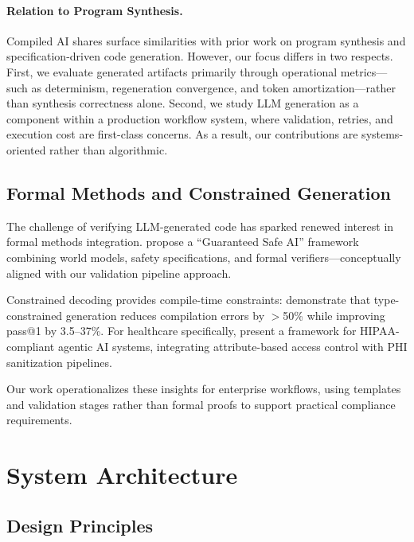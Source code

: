 \documentclass[11pt]{article}
\begin{document}
\paragraph{Relation to Program Synthesis.}
Compiled AI shares surface similarities with prior work on program synthesis and specification-driven code generation. However, our focus differs in two respects. First, we evaluate generated artifacts primarily through operational metrics—such as determinism, regeneration convergence, and token amortization—rather than synthesis correctness alone. Second, we study LLM generation as a component within a production workflow system, where validation, retries, and execution cost are first-class concerns. As a result, our contributions are systems-oriented rather than algorithmic.

\subsection{Formal Methods and Constrained Generation}

The challenge of verifying LLM-generated code has sparked renewed interest in formal methods integration. \citet{dalrymple2024guaranteed} propose a ``Guaranteed Safe AI'' framework combining world models, safety specifications, and formal verifiers—conceptually aligned with our validation pipeline approach.

Constrained decoding provides compile-time constraints: \citet{mundler2025typeconstrained} demonstrate that type-constrained generation reduces compilation errors by $>$50\% while improving pass@1 by 3.5--37\%. For healthcare specifically, \citet{neupane2025hipaa} present a framework for HIPAA-compliant agentic AI systems, integrating attribute-based access control with PHI sanitization pipelines.

Our work operationalizes these insights for enterprise workflows, using templates and validation stages rather than formal proofs to support practical compliance requirements.

\section{System Architecture}
\label{sec:architecture}

\subsection{Design Principles}
\end{document}
